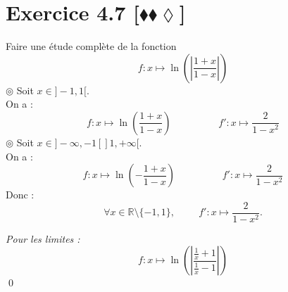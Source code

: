 \documentclass[10pt]{article}
\begin{document}
\section*{Exercice 4.7 [$\blacklozenge\blacklozenge\lozenge$]}
\begin{tcolorbox}[enhanced, width=7in, center, size=fbox, fontupper=\large, drop shadow southwest]
    Faire une étude complète de la fonction 
    \begin{equation*}
        f:x\mapsto\ln\left(\left|\frac{1+x}{1-x}\right|\right)
    \end{equation*}
    $\circledcirc$ Soit $x\in]-1,1[$.\\
    On a :
    \begin{equation*}
        f:x\mapsto\ln\left(\frac{1+x}{1-x}\right) \hspace{2cm} f':x\mapsto\frac{2}{1-x^2}
    \end{equation*}
    $\circledcirc$ Soit $x\in]-\infty,-1[]1,+\infty[$.\\
    On a :
    \begin{equation*}
        f:x\mapsto\ln\left(-\frac{1+x}{1-x}\right) \hspace{2cm} f':x\mapsto\frac{2}{1-x^2}
    \end{equation*}
    Donc :
    \begin{equation*}
        \forall{x\in\mathbb{R}\setminus\{-1,1\}}, \hspace{1cm} f':x\mapsto\frac{2}{1-x^2}.
    \end{equation*}
    \begin{center}
    \end{center}
    \emph{Pour les limites :}
    \begin{equation*}
        f:x\mapsto\ln\left(\left|\frac{\frac{1}{x}+1}{\frac{1}{x}-1}\right|\right)
    \end{equation*}
    \qed
\end{tcolorbox}
\end{document}
